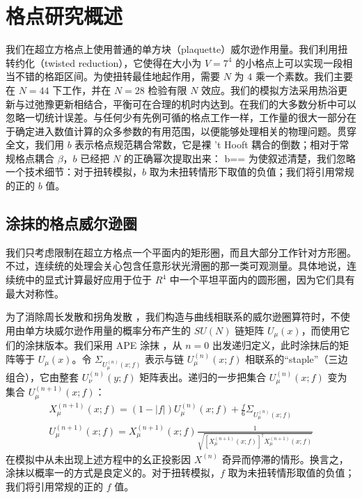 \section{格点研究概述}

我们在超立方格点上使用普通的单方块（plaquette）威尔逊作用量。我们利用扭转约化（twisted reduction）\cite{twist8}，它使得在大小为 $V=7^4$ 的小格点上可以实现一段相当不错的格距区间。为使扭转最佳地起作用，需要 $N$ 为 $4$ 乘一个素数。我们主要在 $N=44$ 下工作，并在 $N=28$ 检验有限 $N$ 效应。我们的模拟方法采用热浴更新与过弛豫更新相结合，平衡可在合理的机时内达到。在我们的大多数分析中可以忽略一切统计误差。与任何少有先例可循的格点工作一样，工作量的很大一部分在于确定进入数值计算的众多参数的有用范围，以便能够处理相关的物理问题。贯穿全文，我们用 $b$ 表示格点规范耦合常数，它是裸 't Hooft 耦合的倒数；相对于常规格点耦合 $\beta$，$b$ 已经把 $N$ 的正确幂次提取出来：
\be
b==\ee
为使叙述清楚，我们忽略一个技术细节：对于扭转模拟，$b$ 取为未扭转情形下取值的负值；我们将引用常规的正的 $b$ 值。

\subsection{涂抹的格点威尔逊圈}

我们只考虑限制在超立方格点一个平面内的矩形圈，而且大部分工作针对方形圈。不过，连续统的处理会关心包含任意形状光滑圈的那一类可观测量。具体地说，连续统中的显式计算最好应用于位于 $R^4$ 中一个平坦平面内的圆形圈，因为它们具有最大对称性。


为了消除周长发散和拐角发散 \cite{div9}，我们构造与曲线相联系的威尔逊圈算符时，不使用由单方块威尔逊作用量的概率分布产生的 $SU(N)$ 链矩阵 $U_\mu (x)$，而使用它们的涂抹版本。我们采用 APE 涂抹 \cite{ape10}，从 $n=0$ 出发递归定义，此时涂抹后的矩阵等于 $U_\mu(x)$。令 $\Sigma_{U^{(n)}_\mu (x;f)}$ 表示与链 $U^{(n)}_\mu(x;f)$ 相联系的``staple''（三边组合），它由整套 $U^{(n)}_\nu(y;f)$ 矩阵表出。递归的一步把集合 $U^{(n)}_\mu (x;f)$ 变为集合 $U^{(n+1)}_\mu (x;f)$：
\begin{eqnarray}
X^{(n+1)}_\mu (x;f)= (1-|f|) U^{(n)}_\mu (x;f)+\frac{f}{6}
\Sigma_{U^{(n)}_\mu (x;f)}\nonumber\\ U^{(n+1)}_\mu (x; f
)=X^{(n+1)}_\mu (x;f) \frac{1}{\sqrt{[X^{(n+1)}_\mu (x;f)]^\dagger
X^{(n+1)}_\mu (x;f)}}
\end{eqnarray}
在模拟中从未出现上述方程中的幺正投影因 $X^{(n)}$ 奇异而停滞的情形。换言之，涂抹以概率一的方式是良定义的。对于扭转模拟，$f$ 取为未扭转情形取值的负值；我们将引用常规的正的 $f$ 值。

